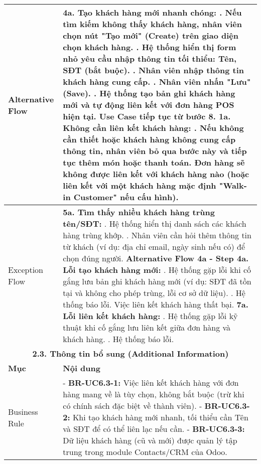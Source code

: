 \begin{longtable}{|m{4cm}|p{11cm}|}
\hline
Alternative Flow & \textbf{4a. Tạo khách hàng mới nhanh chóng:} \newline    1. Nếu tìm kiếm không thấy khách hàng, nhân viên chọn nút "Tạo mới" (Create) trên giao diện chọn khách hàng. \newline    2. Hệ thống hiển thị form nhỏ yêu cầu nhập thông tin tối thiểu: Tên, SĐT (bắt buộc). \newline    3. Nhân viên nhập thông tin khách hàng cung cấp. \newline    4. Nhân viên nhấn "Lưu" (Save). \newline    5. Hệ thống tạo bản ghi khách hàng mới và tự động liên kết với đơn hàng POS hiện tại. Use Case tiếp tục từ bước 8. \newline \textbf{1a. Không cần liên kết khách hàng:} \newline    1. Nếu không cần thiết hoặc khách hàng không cung cấp thông tin, nhân viên bỏ qua bước này và tiếp tục thêm món hoặc thanh toán. Đơn hàng sẽ không được liên kết với khách hàng nào (hoặc liên kết với một khách hàng mặc định "Walk-in Customer" nếu cấu hình). \\
\hline
Exception Flow & \textbf{5a. Tìm thấy nhiều khách hàng trùng tên/SĐT:} \newline    1. Hệ thống hiển thị danh sách các khách hàng trùng khớp. \newline    2. Nhân viên cần hỏi thêm thông tin từ khách (ví dụ: địa chỉ email, ngày sinh nếu có) để chọn đúng người. \newline \textbf{Alternative Flow 4a - Step 4a. Lỗi tạo khách hàng mới:} \newline    1. Hệ thống gặp lỗi khi cố gắng lưu bản ghi khách hàng mới (ví dụ: SĐT đã tồn tại và không cho phép trùng, lỗi cơ sở dữ liệu). \newline    2. Hệ thống báo lỗi. Việc liên kết khách hàng thất bại. \newline \textbf{7a. Lỗi liên kết khách hàng:} \newline    1. Hệ thống gặp lỗi kỹ thuật khi cố gắng lưu liên kết giữa đơn hàng và khách hàng. \newline    2. Hệ thống báo lỗi. \\
\hline
\multicolumn{2}{|c|}{\textbf{2.3. Thông tin bổ sung (Additional Information)}} \\
\hline
\textbf{Mục} & \textbf{Nội dung} \\
\hline
Business Rule & - \textbf{BR-UC6.3-1:} Việc liên kết khách hàng với đơn hàng mang về là tùy chọn, không bắt buộc (trừ khi có chính sách đặc biệt về thành viên). \newline - \textbf{BR-UC6.3-2:} Khi tạo khách hàng mới nhanh, tối thiểu cần Tên và SĐT để có thể liên lạc nếu cần. \newline - \textbf{BR-UC6.3-3:} Dữ liệu khách hàng (cũ và mới) được quản lý tập trung trong module Contacts/CRM của Odoo. \\

\end{longtable}
